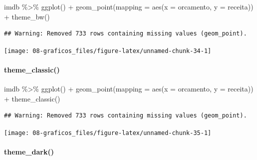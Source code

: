 \documentclass[
]{book}
\newenvironment{Shaded}{\begin{snugshade}}{\end{snugshade}}
\newcommand{\AttributeTok}[1]{\textcolor[rgb]{0.77,0.63,0.00}{#1}}
\newcommand{\FunctionTok}[1]{\textcolor[rgb]{0.00,0.00,0.00}{#1}}
\newcommand{\NormalTok}[1]{#1}
\newcommand{\SpecialCharTok}[1]{\textcolor[rgb]{0.00,0.00,0.00}{#1}}
\begin{document}
\begin{Shaded}
\begin{Highlighting}[]
\NormalTok{imdb }\SpecialCharTok{\%\textgreater{}\%} 
  \FunctionTok{ggplot}\NormalTok{() }\SpecialCharTok{+}
  \FunctionTok{geom\_point}\NormalTok{(}\AttributeTok{mapping =} \FunctionTok{aes}\NormalTok{(}\AttributeTok{x =}\NormalTok{ orcamento, }\AttributeTok{y =}\NormalTok{ receita)) }\SpecialCharTok{+}
  \FunctionTok{theme\_bw}\NormalTok{()}
\end{Highlighting}
\end{Shaded}

\begin{verbatim}
## Warning: Removed 733 rows containing missing values (geom_point).
\end{verbatim}

\begin{center}\texttt{[image: 08-graficos\_files/figure-latex/unnamed-chunk-34-1]} \end{center}

\hypertarget{theme_classic}{%
\paragraph*{theme\_classic()}\label{theme_classic}}

\begin{Shaded}
\begin{Highlighting}[]
\NormalTok{imdb }\SpecialCharTok{\%\textgreater{}\%} 
  \FunctionTok{ggplot}\NormalTok{() }\SpecialCharTok{+}
  \FunctionTok{geom\_point}\NormalTok{(}\AttributeTok{mapping =} \FunctionTok{aes}\NormalTok{(}\AttributeTok{x =}\NormalTok{ orcamento, }\AttributeTok{y =}\NormalTok{ receita)) }\SpecialCharTok{+}
  \FunctionTok{theme\_classic}\NormalTok{()}
\end{Highlighting}
\end{Shaded}

\begin{verbatim}
## Warning: Removed 733 rows containing missing values (geom_point).
\end{verbatim}

\begin{center}\texttt{[image: 08-graficos\_files/figure-latex/unnamed-chunk-35-1]} \end{center}

\hypertarget{theme_dark}{%
\paragraph*{theme\_dark()}\label{theme_dark}}
\end{document}
